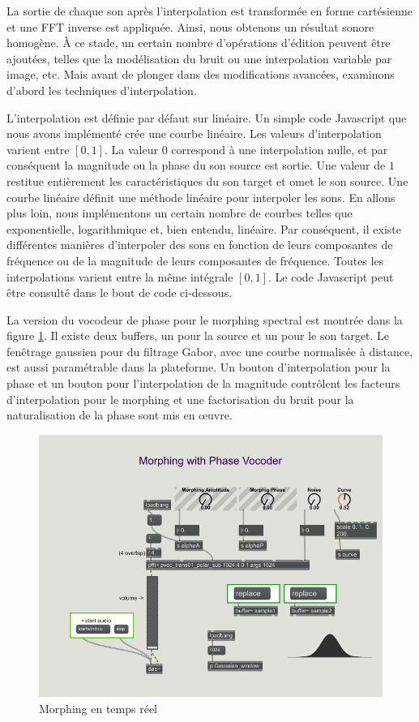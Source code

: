La sortie de chaque son après l’interpolation est transformée en forme cartésienne et une FFT inverse est appliquée. Ainsi, nous obtenons un résultat sonore homogène. À ce stade, un certain nombre d'opérations d'édition peuvent être ajoutées, telles que la modélisation du bruit ou une interpolation variable par image, etc. Mais avant de plonger dans des modifications avancées, examinons d'abord les techniques d'interpolation.

L'interpolation est définie par défaut sur linéaire. Un simple code Javascript que nous avons implémenté crée une courbe linéaire. Les valeurs d'interpolation varient entre $ [0, 1] $. La valeur $ 0 $ correspond à une interpolation nulle, et par conséquent la magnitude ou la phase du son source est sortie. Une valeur de $ 1 $ restitue entièrement les caractéristiques du son target et omet le son source. Une courbe linéaire définit une méthode linéaire pour interpoler les sons. En allons plus loin, nous implémentons un certain nombre de courbes telles que exponentielle, logarithmique et, bien entendu, linéaire. Par conséquent, il existe différentes manières d'interpoler des sons en fonction de leurs composantes de fréquence ou de la magnitude de leurs composantes de fréquence. Toutes les interpolations varient entre la même intégrale $ [0, 1] $. Le code Javascript peut être consulté dans le bout de code ci-dessous.

La version du vocodeur de phase pour le morphing spectral est montrée dans la figure \ref{Morphing}. Il existe deux buffers, un pour la source et un pour le son target. Le fenêtrage gaussien pour du filtrage Gabor, avec une courbe normalisée à distance, est aussi paramétrable dans la plateforme. Un bouton d’interpolation pour la phase et un bouton pour l’interpolation de la magnitude contrôlent les facteurs d’interpolation pour le morphing et une factorisation du bruit pour la naturalisation de la phase sont mis en œuvre.

    \begin{figure}
        \centering
        \includegraphics[width = \textwidth]{Graphs/SoundMorphing.png}
        \caption{Morphing en temps réel}
        \label{Morphing}
    \end{figure}


\noindent\begin{minipage}{\textwidth}

\end{minipage}